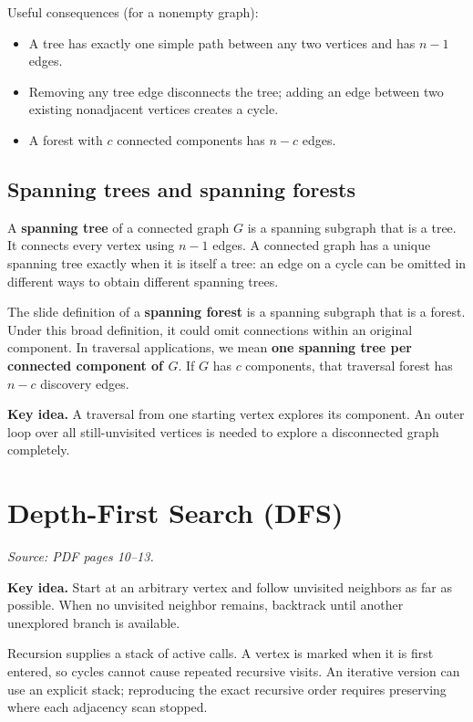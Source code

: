 \documentclass[11pt,letterpaper]{article}
\newcommand{\sourcepages}[1]{\textit{Source: PDF pages #1.}}
\newcommand{\keyidea}[1]{\par\textbf{Key idea.} #1\par}
\begin{document}
Useful consequences (for a nonempty graph):
\begin{itemize}
    \item A tree has exactly one simple path between any two vertices and has $n-1$ edges.
    \item Removing any tree edge disconnects the tree; adding an edge between two existing nonadjacent vertices creates a cycle.
    \item A forest with $c$ connected components has $n-c$ edges.
\end{itemize}

\subsection{Spanning trees and spanning forests}
A \textbf{spanning tree} of a connected graph $G$ is a spanning subgraph that is a tree. It connects every vertex using $n-1$ edges. A connected graph has a unique spanning tree exactly when it is itself a tree: an edge on a cycle can be omitted in different ways to obtain different spanning trees.

The slide definition of a \textbf{spanning forest} is a spanning subgraph that is a forest. Under this broad definition, it could omit connections within an original component. In traversal applications, we mean \textbf{one spanning tree per connected component of $G$}. If $G$ has $c$ components, that traversal forest has $n-c$ discovery edges.

\keyidea{A traversal from one starting vertex explores its component. An outer loop over all still-unvisited vertices is needed to explore a disconnected graph completely.}

\clearpage
\section{Depth-First Search (DFS)}
\sourcepages{10--13}

\keyidea{Start at an arbitrary vertex and follow unvisited neighbors as far as possible. When no unvisited neighbor remains, backtrack until another unexplored branch is available.}

Recursion supplies a stack of active calls. A vertex is marked when it is first entered, so cycles cannot cause repeated recursive visits. An iterative version can use an explicit stack; reproducing the exact recursive order requires preserving where each adjacency scan stopped.
\end{document}

